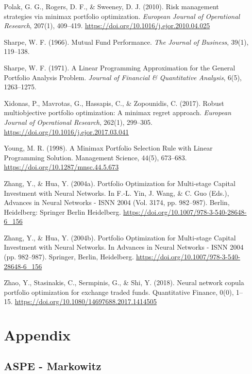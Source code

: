 \documentclass[11pt]{article} %
\begin{document}
\begin{hangparas}{.25in}{1}
Polak, G. G., Rogers, D. F., \& Sweeney, D. J. (2010). Risk management strategies via minimax portfolio optimization.\emph{ European Journal of Operational Research}, 207(1), 409–419. \url{https://doi.org/10.1016/j.ejor.2010.04.025} 

Sharpe, W. F. (1966). Mutual Fund Performance. \emph{The Journal of Business}, 39(1), 119–138.

Sharpe, W. F. (1971). A Linear Programming Approximation for the General Portfolio Analysis Problem. \emph{Journal of Financial \& Quantitative Analysis}, 6(5), 1263–1275.

Xidonas, P., Mavrotas, G., Hassapis, C., \& Zopounidis, C. (2017). Robust multiobjective portfolio optimization: A minimax regret approach. \emph{European Journal of Operational Research}, 262(1), 299–305. \url{https://doi.org/10.1016/j.ejor.2017.03.041}

Young, M. R. (1998). A Minimax Portfolio Selection Rule with Linear Programming Solution. Management Science, 44(5), 673–683. \url{https://doi.org/10.1287/mnsc.44.5.673}

Zhang, Y., \& Hua, Y. (2004a). Portfolio Optimization for Multi-stage Capital Investment with Neural Networks. In F.-L. Yin, J. Wang, \& C. Guo (Eds.), Advances in Neural Networks - ISNN 2004 (Vol. 3174, pp. 982–987). Berlin, Heidelberg: Springer Berlin Heidelberg. \url{https://doi.org/10.1007/978-3-540-28648-6_156}

Zhang, Y., \& Hua, Y. (2004b). Portfolio Optimization for Multi-stage Capital Investment with Neural Networks. In Advances in Neural Networks - ISNN 2004 (pp. 982–987). Springer, Berlin, Heidelberg. \url{https://doi.org/10.1007/978-3-540-28648-6_156}

Zhao, Y., Stasinakis, C., Sermpinis, G., \& Shi, Y. (2018). Neural network copula portfolio optimization for exchange traded funds. Quantitative Finance, 0(0), 1–15. \url{https://doi.org/10.1080/14697688.2017.1414505}

\end{hangparas}


\section*{Appendix}

\subsection*{ASPE - Markowitz}
\end{document}
